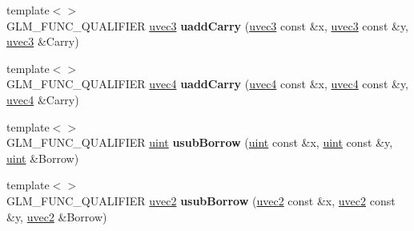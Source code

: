 \begin{DoxyCompactItemize}
\item 
{\footnotesize template$<$$>$ }\\G\+L\+M\+\_\+\+F\+U\+N\+C\+\_\+\+Q\+U\+A\+L\+I\+F\+I\+ER \hyperlink{group__core__types_gac4ba593917841b859ba1683b8b52b8fa}{uvec3} {\bfseries uadd\+Carry} (\hyperlink{group__core__types_gac4ba593917841b859ba1683b8b52b8fa}{uvec3} const \&x, \hyperlink{group__core__types_gac4ba593917841b859ba1683b8b52b8fa}{uvec3} const \&y, \hyperlink{group__core__types_gac4ba593917841b859ba1683b8b52b8fa}{uvec3} \&Carry)\hypertarget{namespaceglm_a2e6210424a7addf84cdeaf17f583d2da}{}\label{namespaceglm_a2e6210424a7addf84cdeaf17f583d2da}

\item 
{\footnotesize template$<$$>$ }\\G\+L\+M\+\_\+\+F\+U\+N\+C\+\_\+\+Q\+U\+A\+L\+I\+F\+I\+ER \hyperlink{group__core__types_ga1c426d19627b32b14f0089f7f4ba7b1d}{uvec4} {\bfseries uadd\+Carry} (\hyperlink{group__core__types_ga1c426d19627b32b14f0089f7f4ba7b1d}{uvec4} const \&x, \hyperlink{group__core__types_ga1c426d19627b32b14f0089f7f4ba7b1d}{uvec4} const \&y, \hyperlink{group__core__types_ga1c426d19627b32b14f0089f7f4ba7b1d}{uvec4} \&Carry)\hypertarget{namespaceglm_af3ad9f57d6e505779a8b35546c31d08b}{}\label{namespaceglm_af3ad9f57d6e505779a8b35546c31d08b}

\item 
{\footnotesize template$<$$>$ }\\G\+L\+M\+\_\+\+F\+U\+N\+C\+\_\+\+Q\+U\+A\+L\+I\+F\+I\+ER \hyperlink{group__core__precision_ga4fd29415871152bfb5abd588334147c8}{uint} {\bfseries usub\+Borrow} (\hyperlink{group__core__precision_ga4fd29415871152bfb5abd588334147c8}{uint} const \&x, \hyperlink{group__core__precision_ga4fd29415871152bfb5abd588334147c8}{uint} const \&y, \hyperlink{group__core__precision_ga4fd29415871152bfb5abd588334147c8}{uint} \&Borrow)\hypertarget{namespaceglm_a8b489a758eb61d6308ecdf33081da3be}{}\label{namespaceglm_a8b489a758eb61d6308ecdf33081da3be}

\item 
{\footnotesize template$<$$>$ }\\G\+L\+M\+\_\+\+F\+U\+N\+C\+\_\+\+Q\+U\+A\+L\+I\+F\+I\+ER \hyperlink{group__core__types_gafd2041b45eff671aa8899d2c2835eee9}{uvec2} {\bfseries usub\+Borrow} (\hyperlink{group__core__types_gafd2041b45eff671aa8899d2c2835eee9}{uvec2} const \&x, \hyperlink{group__core__types_gafd2041b45eff671aa8899d2c2835eee9}{uvec2} const \&y, \hyperlink{group__core__types_gafd2041b45eff671aa8899d2c2835eee9}{uvec2} \&Borrow)\hypertarget{namespaceglm_a5c3c7dfa6a8edab85fce4a945e0dc373}{}\label{namespaceglm_a5c3c7dfa6a8edab85fce4a945e0dc373}


\end{DoxyCompactItemize}
